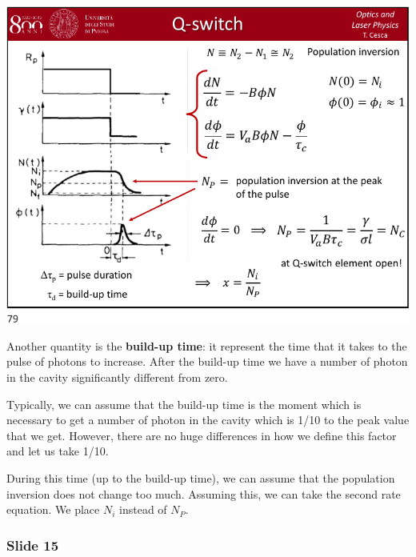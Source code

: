 \documentclass[../main/main.tex]{subfiles}
\begin{document}
\begin{minipage}[]{0.5\linewidth}
\centering
\includegraphics[page=14,width=1\textwidth]{../lessons/pdf_file/15_lecture.pdf}
\end{minipage}
\hspace{0.3cm}\vspace{0.3cm}
\begin{minipage}[c]{0.47\linewidth}

Another quantity is the \textbf{build-up time}: it represent the time that it takes to the pulse of photons to increase. After the build-up time we have a number of photon in the cavity significantly different from zero.

Typically, we can assume that the build-up time is the moment which is necessary to get a number of photon in the cavity which is 1/10 to the peak value that we get. However, there are no huge differences in how we define this factor and let us take 1/10.

During this time (up to the build-up time), we can assume that the population inversion does not change too much. Assuming this, we can take the second rate equation. We place \( N_i \) instead of \( N_P \).

\end{minipage}

\subsubsection*{Slide 15}
\end{document}
